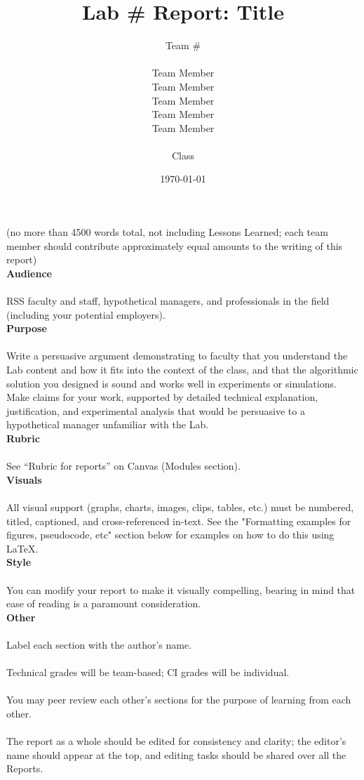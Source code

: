 \documentclass{article}
\title{Lab \# Report: Title} %
\author{Team \# \\\\ Team Member \\ Team Member \\ Team Member \\ Team Member \\ Team Member \\\\ Class} %
\date{\today} %
\begin{document}
\maketitle

(no more than 4500 words total, not including Lessons Learned; each team member should contribute approximately equal amounts to the writing of this report)\\

\textbf{Audience}\\\\
RSS faculty and staff, hypothetical managers, and professionals in the field (including your potential employers).\\

\textbf{Purpose}\\\\
Write a persuasive argument demonstrating to faculty that you understand the Lab content and how it fits into the context of the class, and that the algorithmic solution you designed is sound and works well in experiments or simulations.  Make claims for your work, supported by detailed technical explanation, justification, and experimental analysis that would be persuasive to a hypothetical manager unfamiliar with the Lab.\\

\textbf{Rubric}\\\\
See “Rubric for reports” on Canvas (Modules section).\\

\textbf{Visuals}\\\\
All visual support (graphs, charts, images, clips, tables, etc.) must be numbered, titled, captioned, and cross-referenced in-text. See the "Formatting examples for figures, pseudocode, etc" section below for examples on how to do this using LaTeX.\\

\textbf{Style}\\\\
You can modify your report to make it visually compelling, bearing in mind that ease of reading is a paramount consideration.\\

\textbf{Other}\\\\
Label each section with the author’s name.\\\\
Technical grades will be team-based; CI grades will be individual.\\\\
You may peer review each other’s sections for the purpose of learning from each other.\\\\
The report as a whole should be edited for consistency and clarity; the editor’s name should appear at the top, and editing tasks should be shared over all the Reports.\\
\end{document}
